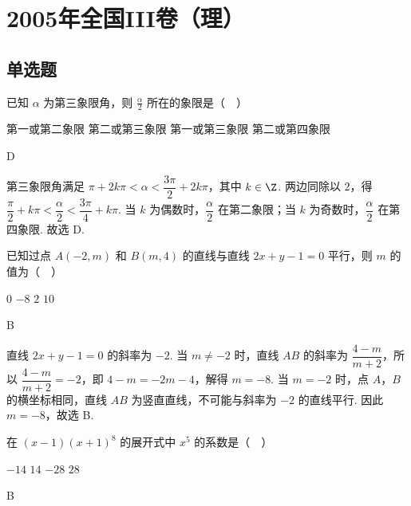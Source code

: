 \chapter{2005年全国III卷（理）}
\section{单选题}
\begin{problem}
已知 \(\alpha\) 为第三象限角，则 \(\frac{\alpha}{2}\) 所在的象限是（\(\quad\)）

\choices
    {第一或第二象限}
    {第二或第三象限}
    {第一或第三象限}
    {第二或第四象限}
\end{problem}

\begin{answer}
D
\end{answer}

\begin{solution}
第三象限角满足 \(\pi+2k\pi<\alpha<\dfrac{3\pi}{2}+2k\pi\)，其中 \(k\in\Z\). 两边同除以 \(2\)，得 \(\dfrac{\pi}{2}+k\pi<\dfrac{\alpha}{2}<\dfrac{3\pi}{4}+k\pi\). 当 \(k\) 为偶数时，\(\dfrac{\alpha}{2}\) 在第二象限；当 \(k\) 为奇数时，\(\dfrac{\alpha}{2}\) 在第四象限. 故选 D.
\end{solution}

\begin{problem}
已知过点 \(A(-2, m)\) 和 \(B(m, 4)\) 的直线与直线 \(2x + y - 1 = 0\) 平行，则 \(m\) 的值为（\(\quad\)）

\choices
    {\(0\)}
    {\(-8\)}
    {\(2\)}
    {\(10\)}
\end{problem}

\begin{answer}
B
\end{answer}

\begin{solution}
直线 \(2x+y-1=0\) 的斜率为 \(-2\). 当 \(m\neq-2\) 时，直线 \(AB\) 的斜率为 \(\dfrac{4-m}{m+2}\)，所以 \(\dfrac{4-m}{m+2}=-2\)，即 \(4-m=-2m-4\)，解得 \(m=-8\). 当 \(m=-2\) 时，点 \(A\)，\(B\) 的横坐标相同，直线 \(AB\) 为竖直直线，不可能与斜率为 \(-2\) 的直线平行. 因此 \(m=-8\)，故选 B.
\end{solution}

\begin{problem}
在 \((x - 1)(x + 1)^8\) 的展开式中 \(x^5\) 的系数是（\(\quad\)）

\choices
    {\(-14\)}
    {\(14\)}
    {\(-28\)}
    {\(28\)}
\end{problem}

\begin{answer}
B
\end{answer}

